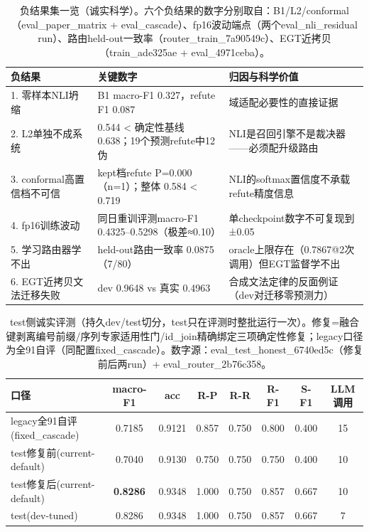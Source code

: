 \begin{table}[t]
\centering
\small
\caption{负结果集一览（诚实科学）。六个负结果的数字分别取自：B1/L2/conformal（eval\_paper\_matrix + eval\_cascade）、fp16波动端点（两个eval\_nli\_residual run）、路由held-out一致率（router\_train\_7a90549c）、EGT近拷贝（train\_ade325ae + eval\_4971ceba）。}
\label{tab:negative}
\begin{tabular}{p{2.9cm}p{4.4cm}p{4.6cm}}
\toprule
负结果 & 关键数字 & 归因与科学价值 \\
\midrule
1. 零样本NLI坍缩 & B1 macro-F1 0.327，refute F1 0.087 & 域适配必要性的直接证据 \\
2. L2单独不成系统 & 0.544 < 确定性基线 0.638；19个预测refute中12伪 & NLI是召回引擎不是裁决器——必须配升级路由 \\
3. conformal高置信档不可信 & kept档refute P=0.000（n=1）；整体 0.584 < 0.719 & NLI的softmax置信度不承载refute精度信息 \\
4. fp16训练波动 & 同日重训评测macro-F1 0.4325–0.5298（极差≈0.10） & 单checkpoint数字不可复现到±0.05 \\
5. 学习路由器学不出 & held-out路由一致率 0.0875（7/80） & oracle上限存在（0.7867@2次调用）但EGT监督学不出 \\
6. EGT近拷贝文法迁移失败 & dev 0.9648 vs 真实 0.4963 & 合成文法定律的反面例证（dev对迁移零预测力） \\
\bottomrule
\end{tabular}
\end{table}

\begin{table}[t]
\centering
\small
\caption{test侧诚实评测（持久dev/test切分，test只在评测时整批运行一次）。修复=融合键剥离编号前缀/序列专家适用性门/id\_join精确绑定三项确定性修复；legacy口径为全91自评（同配置fixed\_cascade）。数字源：eval\_test\_honest\_6740ed5c（修复前后两run）+ eval\_router\_2b76c358。}
\label{tab:test_honest}
\begin{tabular}{p{3.4cm}ccccccc}
\toprule
口径 & macro-F1 & acc & R-P & R-R & R-F1 & S-F1 & LLM调用 \\
\midrule
legacy全91自评(fixed_cascade) & 0.7185 & 0.9121 & 0.857 & 0.750 & 0.800 & 0.400 & 15 \\
test修复前(current-default) & 0.7040 & 0.9130 & 0.750 & 0.750 & 0.750 & 0.400 & 10 \\
test修复后(current-default) & \textbf{0.8286} & 0.9348 & 1.000 & 0.750 & 0.857 & 0.667 & 10 \\
test(dev-tuned) & 0.8286 & 0.9348 & 1.000 & 0.750 & 0.857 & 0.667 & 7 \\
\bottomrule
\end{tabular}
\end{table}


